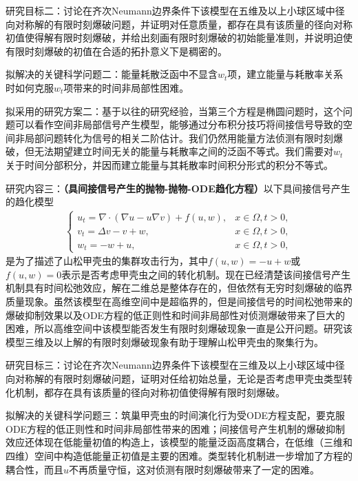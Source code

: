 \documentclass[12pt]{article}
\begin{document}
研究目标二：讨论在齐次Neumann边界条件下该模型在五维及以上小球区域中径向对称解的有限时刻爆破问题，并证明对任意质量，都存在具有该质量的径向对称初值使得解有限时刻爆破，并给出刻画有限时刻爆破的初始能量准则，并说明迫使有限时刻爆破的初值在合适的拓扑意义下是稠密的。

拟解决的关键科学问题二：能量耗散泛函中不显含$w_t$项，建立能量与耗散率关系时如何克服$w_t$项带来的时间非局部性困难。

拟采用的研究方案二：基于以往的研究经验，当第三个方程是椭圆问题时，这个问题可以看作空间非局部信号产生模型，能够通过分布积分技巧将间接信号导致的空间非局部问题转化为信号的相关二阶估计。我们仍然用能量方法侦测有限时刻爆破，但无法期望建立时间无关的能量与耗散率之间的泛函不等式。我们需要对$w_t$关于时间分部积分，并因而建立能量与其耗散率时间积分形式的积分不等式。

研究内容三：\textbf{（具间接信号产生的抛物-抛物-ODE趋化方程）}以下具间接信号产生的趋化模型
\begin{align}
    \begin{cases}
      \label{sys: ks isp ppodef}
        u_t =  \nabla\cdot(\nabla u - u\nabla v) + f(u,w),& x\in\Omega, t>0,\\
        v_t =  \Delta v - v + w,& x\in\Omega,	 t>0,\\
        w_t  = - w + u, & x\in\Omega, t > 0, 
    \end{cases}
\end{align}
是为了描述了山松甲壳虫的集群攻击行为，其中$f(u,w)=-u+w$或$f(u,w)=0$表示是否考虑甲壳虫之间的转化机制。现在已经清楚该间接信号产生机制具有时间松弛效应，解在二维总是整体存在的，但依然有无穷时刻爆破的临界质量现象。虽然该模型在高维空间中是超临界的，但是间接信号的时间松弛带来的爆破抑制效果以及ODE方程的低正则性和时间非局部性对侦测爆破带来了巨大的困难，所以高维空间中该模型能否发生有限时刻爆破现象一直是公开问题。研究该模型三维及以上解的有限时刻爆破现象有助于理解山松甲壳虫的聚集行为。

研究目标三：讨论在齐次Neumann边界条件下该模型在三维及以上小球区域中径向对称解的有限时刻爆破问题，证明对任给初始总量，无论是否考虑甲壳虫类型转化机制，都存在具有该质量的径向对称初值使得解有限时刻爆破。

拟解决的关键科学问题三：筑巢甲壳虫的时间演化行为受ODE方程支配，要克服ODE方程的低正则性和时间非局部性带来的困难；间接信号产生机制的爆破抑制效应还体现在低能量初值的构造上，该模型的能量泛函高度耦合，在低维（三维和四维）空间中构造低能量正初值是主要的困难。类型转化机制进一步增加了方程的耦合性，而且$u$不再质量守恒，这对侦测有限时刻爆破带来了一定的困难。
\end{document}
